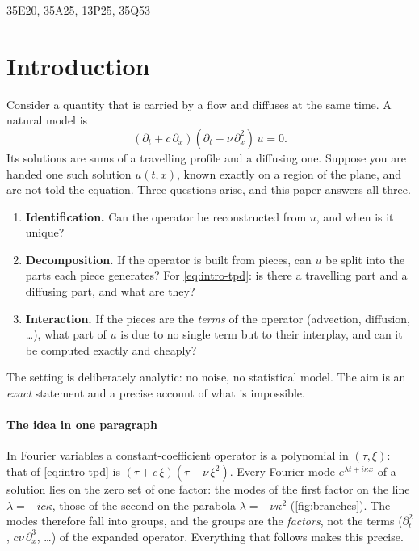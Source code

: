 \begin{MSCcodes}
35E20, 35A25, 13P25, 35Q53
\end{MSCcodes}

\section{Introduction}\label{sec:intro}
Consider a quantity that is carried by a flow and diffuses at the same time. A natural model is
\begin{equation}\label{eq:intro-tpd}
  (\partial_t+c\,\partial_x)(\partial_t-\nu\,\partial_x^2)\,u=0 .
\end{equation}
Its solutions are sums of a travelling profile and a diffusing one. Suppose you are handed one such solution $u(t,x)$, known exactly on a region of the plane, and are not told the equation.
Three questions arise, and this paper answers all three.
\begin{enumerate}[label=\textbf{Q\arabic*.},leftmargin=1.1cm,nosep]
\item \textbf{Identification.} Can the operator be reconstructed from $u$, and when is it unique?
\item \textbf{Decomposition.} If the operator is built from pieces, can $u$ be split into the parts each piece generates? For \eqref{eq:intro-tpd}: is there a travelling part and a diffusing part, and what are they?
\item \textbf{Interaction.} If the pieces are the \emph{terms} of the operator (advection, diffusion, \dots), what part of $u$ is due to no single term but to their interplay, and can it be computed exactly and cheaply?
\end{enumerate}
The setting is deliberately analytic: no noise, no statistical model. The aim is an \emph{exact} statement and a precise account of what is impossible.

\paragraph{The idea in one paragraph} In Fourier variables a constant-coefficient operator is a polynomial in $(\tau,\xi)$: that of \eqref{eq:intro-tpd} is $(\tau+c\,\xi)(\tau-\nu\,\xi^2)$. Every Fourier mode
$e^{\lambda t+i\kappa x}$ of a solution lies on the zero set of one factor: the modes of the first factor on the line $\lambda=-ic\kappa$, those of the second on the parabola $\lambda=-\nu\kappa^2$ (\cref{fig:branches}).
The modes therefore fall into groups, and the groups are the \emph{factors}, not the terms ($\partial_t^2$, $c\nu\,\partial_x^3$, \dots) of the expanded operator. Everything that follows makes this precise.


